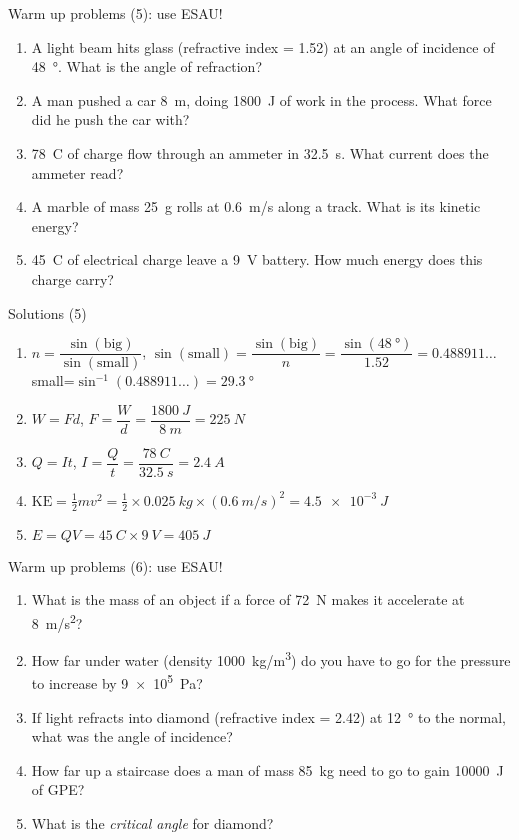 \documentclass[14pt]{beamer}
\begin{document}
\begin{frame}{Warm up problems (5): use ESAU!}
\vspace*{-0.8em}\begin{enumerate}
\item\label{15.3} A light beam hits glass (refractive index = 1.52) at an angle of incidence of \SI{48}{\degree}.  What is the angle of refraction?
\item\label{5.2} A man pushed a car \SI{8}{m}, doing \SI{1800}{J} of work in the process.  What force did he push the car with?
\item\label{10.2} \SI{78}{C} of charge flow through an ammeter in \SI{32.5}{s}.  What current does the ammeter read?
\item\label{6.1} A marble of mass \SI{25}{g} rolls at \SI{0.6}{m/s} along a track.  What is its kinetic energy?
\item\label{13.1} \SI{45}{C} of electrical charge leave a \SI{9}{V} battery.  How much energy does this charge carry?
\end{enumerate}
\end{frame}

\begin{frame}{Solutions (5)}
\vspace*{-0.8em}\begin{enumerate}
\item\label{15.3} $n=\dfrac{\sin(\text{big})}{\sin(\text{small})}$, $\sin(\text{small})=\dfrac{\sin(\text{big})}{n}=\dfrac{\sin(\SI{48}{\degree})}{1.52}=0.488911\ldots$\\
small=$\sin^{-1}(0.488911\ldots)=\SI{29.3}{\degree}$
\item\label{5.2} $W=Fd$, $F=\dfrac{W}{d}=\dfrac{\SI{1800}{J}}{\SI{8}{m}}=\SI{225}{N}$
\item\label{10.2} $Q=It$, $I=\dfrac{Q}{t}=\dfrac{\SI{78}{C}}{\SI{32.5}{s}}=\SI{2.4}{A}$
\item\label{6.1} $\text{KE}=\frac{1}{2}mv^{2}=\frac{1}{2}\times\SI{0.025}{kg}\times(\SI{0.6}{m/s})^2=\SI{4.5e-3}{J}$
\item\label{13.1} $E=QV=\SI{45}{C}\times\SI{9}{V}=\SI{405}{J}$
\end{enumerate}
\end{frame}

\begin{frame}{Warm up problems (6): use ESAU!}
\vspace*{-0.8em}\begin{enumerate}
\item\label{2.2} What is the mass of an object if a force of \SI{72}{N} makes it accelerate at \SI{8}{m/s^{2}}?
\item\label{18.3} How far under water (density \SI{1000}{kg/m^3}) do you have to go for the pressure to increase by \SI{9e5}{Pa}?
\item\label{15.2} If light refracts into diamond (refractive index = 2.42) at \SI{12}{\degree} to the normal, what was the angle of incidence?
\item\label{7.3} How far up a staircase does a man of mass \SI{85}{kg} need to go to gain \SI{10000}{J} of GPE?
\item\label{16.3} What is the \emph{critical angle} for diamond?
\end{enumerate}
\end{frame}
\end{document}
